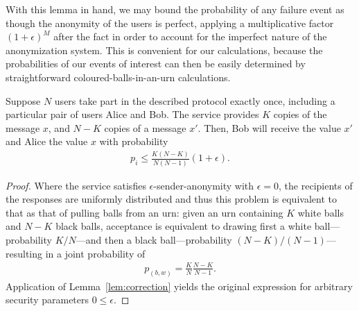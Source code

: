\documentclass[USenglish]{llncs}
\begin{document}
With this lemma in hand, we may bound the probability of any failure event
as though the anonymity of the users is perfect, applying a multiplicative
factor $(1+\epsilon)^M$ after the fact in order to account for the imperfect
nature of the anonymization system.  This is convenient for our calculations,
because the probabilities of our events of interest can then be easily determined
by straightforward coloured-balls-in-an-urn calculations.

\begin{lemma}\label{lem:transfer}
Suppose $N$
users take part in the described protocol exactly once, including a particular
pair of users Alice and Bob.
 The service provides $K$ copies of the message $x$, and $N-K$ copies
of a message $x'$.  Then, Bob will receive the value $x'$ 
and Alice the value $x$ with probability
\begin{align} p_i \le \frac{K (N-K)}{N(N-1)}  (1+\epsilon) . \end{align}
\begin{proof}
Where the service satisfies $\epsilon$-sender-anonymity with $\epsilon=0$,
the recipients of the responses are uniformly  distributed and thus
this problem is equivalent to that as that of pulling balls from an urn: given an urn
containing $K$ white
balls and $N-K$ black balls, acceptance is equivalent to drawing first a
white ball---probability \(K/N\)---and then a black ball---probability
\((N-K)/(N-1)\)---resulting in a joint probability of
\begin{align}p_{(b,w)} = \frac{K}{N} \frac{N-K}{N-1} .\end{align}
Application of Lemma~\ref{lem:correction} yields the original expression for
arbitrary security parameters $0 \le \epsilon$.
\end{proof}
\end{lemma}
\end{document}
